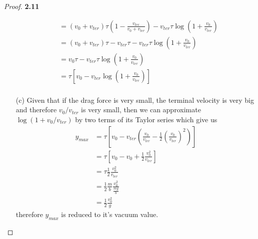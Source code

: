 \documentclass[11pt]{article}
\theoremstyle{definition}
\begin{document}
\begin{proof}{\textbf{2.11}}
\begin{itemize}
\begin{align*}
                &= (v_{0} + v_{ter})\tau(1 - \frac{v_{ter}}{v_0 + v_{ter}}) - v_{ter}\tau \log\left(1 + \frac{v_0}{v_{ter}}\right)\\
                &= (v_{0} + v_{ter})\tau - v_{ter}\tau - v_{ter}\tau \log\left(1 + \frac{v_0}{v_{ter}}\right)\\
                &= v_{0}\tau - v_{ter}\tau \log\left(1 + \frac{v_0}{v_{ter}}\right)\\
                &= \tau\left[v_{0} - v_{ter} \log\left(1 + \frac{v_0}{v_{ter}}\right)\right]\\
        \end{align*}
        \item[(c)] Given that if the drag force is very small, the terminal
        velocity is very big and therefore $v_0/v_{ter}$ is very small, then we
        can approximate $\log(1 + v_0/v_{ter})$ by two terms of its Taylor series
        which give us
        \begin{align*}
            y_{max} &= \tau\left[v_{0} - v_{ter}\left(
                \frac{v_0}{v_{ter}} -
                \frac{1}{2}\left(\frac{v_0}{v_{ter}}\right)^2
                \right)
            \right]\\
                    &= \tau\left[
                        v_{0} -
                        v_0 +
                        \frac{1}{2} \frac{v_0^2}{v_{ter}}
                    \right]\\
                    &= \tau \frac{1}{2} \frac{v_0^2}{v_{ter}}\\
                    &= \frac{1}{2} \frac{m}{b} \frac{v_0^2}{\frac{mg}{b}}\\
                    &= \frac{1}{2}\frac{v_0^2}{g}
        \end{align*}
        therefore $y_{max}$ is reduced to it's vacuum value.
        \end{itemize} 
    \end{proof}
\cleardoublepage
\end{document}
